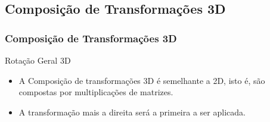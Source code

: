 \documentclass{beamer}
\begin{document}
%	
%	
%
%
%		
%			
%	


\begin{frame}
\section{Composição de Transformações 3D}
\frametitle{Composição de Transformações 3D}
	\begin{block}{Rotação Geral 3D}
		\begin{itemize}
			\item A Composição de transformações 3D é semelhante a 2D, isto é, são compostas por multiplicações de matrizes.
			\item A transformação mais a direita será a primeira a ser aplicada.
		\end{itemize}
	\end{block}

\end{frame}
\end{document}
